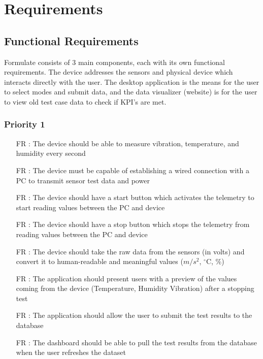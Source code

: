 \documentclass[12pt]{article}
\newcounter{reqnum} %
\begin{document}
  \newpage

\section{Requirements}

\subsection{Functional Requirements}
Formulate consists of 3 main components, each with its own functional requirements. The device addresses the sensors and physical device which interacts directly with the user. The desktop application is the means for the user to select modes and submit data, and the data visualizer (website) is for the user to view old test case data to check if KPI's are met.



\subsubsection{Priority 1} 

\begin{itemize}
  
  \item[FR \refstepcounter{reqnum}\thereqnum:] The device should be able to measure vibration, temperature, and humidity every second
  
  \item[FR \refstepcounter{reqnum}\thereqnum:] The device must be capable of establishing a wired connection with a PC to transmit sensor test data and power
  
  \item[FR \refstepcounter{reqnum}\thereqnum:] The device should have a start button which activates the telemetry to start reading values between the PC and device 
  
  \item[FR \refstepcounter{reqnum}\thereqnum:] The device should have a stop button which stops the telemetry from reading values between the PC and device
  
  \item[FR \refstepcounter{reqnum}\thereqnum:] The device should take the raw data from the sensors (in volts) and convert it to human-readable and meaningful values ($m/s^2$, $^\circ$C, \%)
  
  \item[FR \refstepcounter{reqnum}\thereqnum:] The application should present users with a preview of the values coming from the device (Temperature, Humidity Vibration) after a stopping test

  \item[FR \refstepcounter{reqnum}\thereqnum:] The application should allow the user to submit the test results to the database
  
  \item[FR \refstepcounter{reqnum}\thereqnum:] The dashboard should be able to pull the test results from the database when the user refreshes the dataset
  
  \end{itemize}
\end{document}
